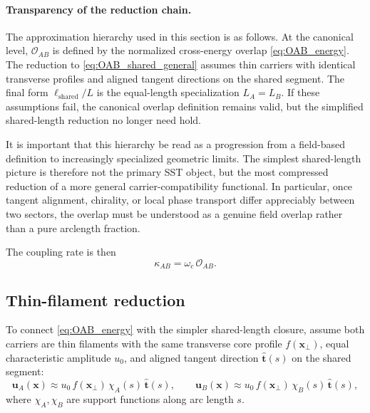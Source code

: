 \documentclass[11pt]{article}
\begin{document}
        \paragraph{Transparency of the reduction chain.}
        The approximation hierarchy used in this section is as follows. At the canonical level, \(\mathcal{O}_{AB}\) is defined by the normalized cross-energy overlap \cref{eq:OAB_energy}. The reduction to \cref{eq:OAB_shared_general} assumes thin carriers with identical transverse profiles and aligned tangent directions on the shared segment. The final form \(\ell_{\mathrm{shared}}/L\) is the equal-length specialization \(L_A=L_B\). If these assumptions fail, the canonical overlap definition remains valid, but the simplified shared-length reduction no longer need hold.

        It is important that this hierarchy be read as a progression from a field-based definition to increasingly specialized geometric limits. The simplest shared-length picture is therefore not the primary SST object, but the most compressed reduction of a more general carrier-compatibility functional. In particular, once tangent alignment, chirality, or local phase transport differ appreciably between two sectors, the overlap must be understood as a genuine field overlap rather than a pure arclength fraction.
        
        The coupling rate is then
        \begin{equation}
            \boxed{
                \kappa_{AB}=\omega_c\,\mathcal{O}_{AB}.
            }
            \label{eq:kappa_energy_overlap}
        \end{equation}
        
        \subsection{Thin-filament reduction}
            
            To connect \cref{eq:OAB_energy} with the simpler shared-length closure, assume both carriers are thin filaments with the same transverse core profile \(f(\mathbf{x}_\perp)\), equal characteristic amplitude \(u_0\), and aligned tangent direction \(\hat{\mathbf{t}}(s)\) on the shared segment:
            \begin{equation}
                \mathbf{u}_A(\mathbf{x})
                \approx
                u_0\,f(\mathbf{x}_\perp)\,\chi_A(s)\,\hat{\mathbf{t}}(s),
                \qquad
                \mathbf{u}_B(\mathbf{x})
                \approx
                u_0\,f(\mathbf{x}_\perp)\,\chi_B(s)\,\hat{\mathbf{t}}(s),
            \end{equation}
            where \(\chi_A,\chi_B\) are support functions along arc length \(s\).
            
\end{document}
